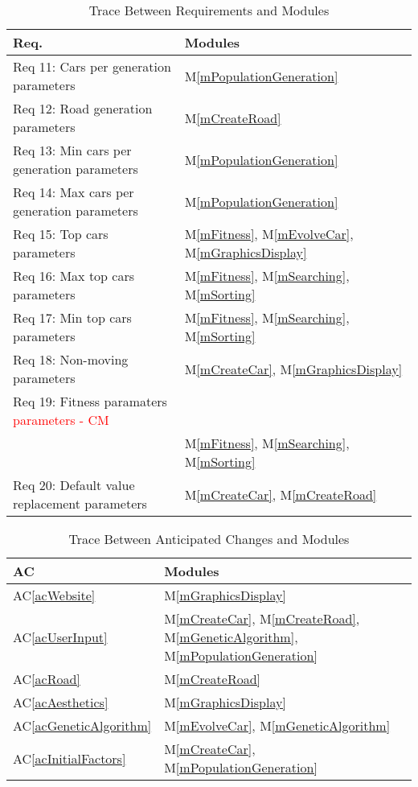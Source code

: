 \documentclass[12pt, titlepage]{article}
\newcommand{\acref}[1]{AC\ref{#1}}
\newcommand{\mref}[1]{M\ref{#1}}
\begin{document}
\begin{table}[H]
\centering
\begin{tabular}{p{} p{}}
\toprule
\textbf{Req.} & \textbf{Modules}\\
\midrule
Req 11: Cars per generation parameters &\mref{mPopulationGeneration}\\ 
Req 12: Road generation parameters & \mref{mCreateRoad}\\
Req 13: Min cars per generation parameters & \mref{mPopulationGeneration}\\
Req 14: Max cars per generation parameters & \mref{mPopulationGeneration}\\
Req 15: Top cars parameters & \mref{mFitness}, \mref{mEvolveCar}, 
\mref{mGraphicsDisplay}\\
Req 16: Max top cars parameters & \mref{mFitness},  \mref{mSearching},  
\mref{mSorting}\\
Req 17: Min top cars parameters & \mref{mFitness}, \mref{mSearching}, 
\mref{mSorting}\\
Req 18: Non-moving parameters & \mref{mCreateCar}, \mref{mGraphicsDisplay}\\
Req 19: Fitness paramaters \textcolor{red}{parameters - CM} \\ & \mref{mFitness},  \mref{mSearching},  
\mref{mSorting}\\
Req 20: Default value replacement parameters & \mref{mCreateCar}, 
\mref{mCreateRoad}\\
\bottomrule
\end{tabular}
\caption{Trace Between Requirements and Modules}
\label{TblRT2}
\end{table}

\begin{table}[H]
\centering
\begin{tabular}{p{} p{}}
\toprule
\textbf{AC} & \textbf{Modules}\\
\midrule
\acref{acWebsite} & \mref{mGraphicsDisplay}\\
\acref{acUserInput} & \mref{mCreateCar}, \mref{mCreateRoad}, 
\mref{mGeneticAlgorithm}, \mref{mPopulationGeneration}\\
\acref{acRoad} & \mref{mCreateRoad}\\
\acref{acAesthetics} & \mref{mGraphicsDisplay}\\
\acref{acGeneticAlgorithm} & \mref{mEvolveCar}, \mref{mGeneticAlgorithm}\\
\acref{acInitialFactors} & \mref{mCreateCar}, \mref{mPopulationGeneration}\\
\bottomrule
\end{tabular}
\caption{Trace Between Anticipated Changes and Modules}
\label{TblACT}
\end{table}
\end{document}
